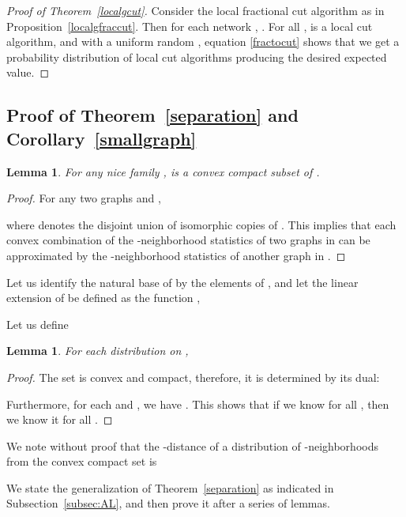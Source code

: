 \documentclass[12pt,a4paper]{article}
\newtheorem{Lemma}[Theorem]{Lemma}
\renewcommand{\:}{\colon}
\begin{document}
\begin{proof}[Proof of Theorem~\ref{localgcut}]
Consider the local fractional cut algorithm  as in Proposition~\ref{localgfraccut}. 
Then for each network , . 
For all ,  is a local cut algorithm, and with a uniform random , equation \eqref{fractocut} shows that we get a probability distribution of local cut algorithms producing the desired expected value.
\end{proof}


\subsection{Proof of Theorem~\ref{separation} and Corollary~\ref{smallgraph}}\label{subs:pumping}

\begin{Lemma} \label{convex}
For any nice family ,  is a convex compact subset of .
\end{Lemma}

\begin{proof}
For any two graphs  and ,

where  denotes the disjoint union of  isomorphic copies of . 
This implies that each convex combination of the -neighborhood statistics of two graphs in  can be approximated by the -neighborhood statistics of another graph in .
\end{proof}

Let us identify the natural base of  by the elements of , and let the linear extension of  be defined as the function ,

Let us define


\begin{Lemma}\label{lem:convexdist}
For each distribution  on ,

\end{Lemma}

\begin{proof}
The set  is convex and compact, therefore, it is determined by its dual:

Furthermore, for each  and , we have . This shows that if we know  for all , then we know it for all .
\end{proof}

We note without proof that the -distance of a distribution of -neighborhoods  from the convex compact set  is 



We state the generalization of Theorem~\ref{separation} as indicated in Subsection~\ref{subsec:AL}, and then prove it after a series of lemmas. 
\end{document}
